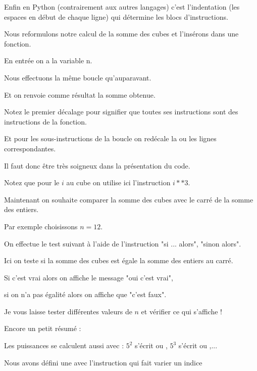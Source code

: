 \change

 Enfin en Python  (contrairement aux autres langages) 
 c'est l'indentation (les espaces en début de chaque ligne)
 qui détermine les blocs d'instructions. 
  
  
\diapo

Nous reformulons notre calcul de la somme des cubes et l'insérons dans une fonction.

En entrée on a la variable n.

Nous effectuons la même boucle qu'auparavant.

Et on renvoie comme résultat la somme obtenue.

Notez le premier décalage pour signifier que toutes 
ses instructions sont des instructions de la fonction.

Et pour les sous-instructions de la boucle on redécale 
la ou les lignes correspondantes.

Il faut donc être très soigneux dans la présentation du code.

Notez que pour le $i$ au cube on utilise ici l'instruction $i * * 3$.


\change

Maintenant on souhaite comparer la somme des cubes avec le carré de la somme des entiers.

Par exemple choisissons $n=12$.

On effectue le test suivant à l'aide de l'instruction "si ... alors", "sinon alors".

Ici on teste si la somme des cubes est égale la somme des entiers au carré.

Si c'est vrai  alors on affiche le message "oui c'est vrai",

si on n'a pas égalité alors on affiche que "c'est faux".

Je vous laisse tester différentes valeurs de $n$ et vérifier ce qui s'affiche !



\diapo

Encore un petit résumé :

Les puissances se calculent aussi avec \codeinline{**} : $5^2$ s'écrit  ou ,
  $5^3$ s'écrit  ou ,...

\change

Nous avons défini une 
avec l'instruction  qui fait varier un indice 

